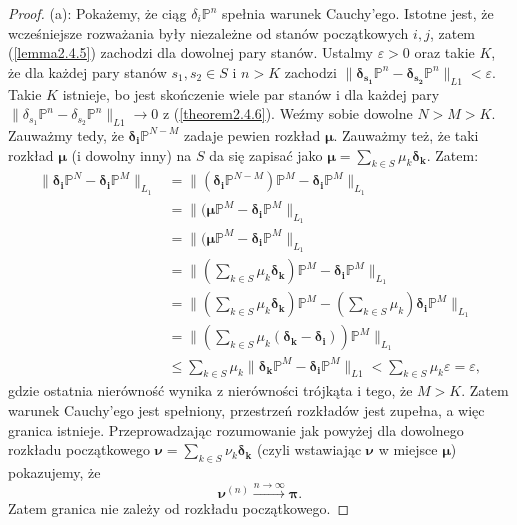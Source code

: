\documentclass[a4paper]{article}
\theoremstyle{defn}
\theoremstyle{theorem}
\theoremstyle{lemma}
\theoremstyle{cor}
\theoremstyle{fact}
\begin{document}
\begin{proof}
(a): Pokażemy, że ciąg $\delta_i\mathbb{P}^n$ spełnia warunek Cauchy'ego. Istotne jest, że wcześniejsze rozważania były niezależne od stanów początkowych $i, j$, zatem (\ref{lemma2.4.5}) zachodzi dla dowolnej pary stanów. Ustalmy $\varepsilon > 0$ oraz takie $K$, że dla każdej pary stanów $s_1, s_2 \in S$ i $n > K$  zachodzi $\|\boldsymbol{\delta_{s_1}}\mathbb{P}^n - \boldsymbol{\delta_{s_2}}\mathbb{P}^n\|_{L1} < \varepsilon$. Takie $K$ istnieje, bo jest skończenie wiele par stanów i dla każdej pary $\|\delta_{s_1}\mathbb{P}^n - \delta_{s_2}\mathbb{P}^n\|_{L1} \to 0$ z (\ref{theorem2.4.6}). Weźmy sobie dowolne $N > M > K$. Zauważmy tedy, że $\boldsymbol{\delta_i}\mathbb{P}^{N-M}$ zadaje pewien rozkład $\boldsymbol{\mu}$. Zauważmy też, że taki rozkład $\boldsymbol{\mu}$ (i dowolny inny) na $S$ da się zapisać jako $\boldsymbol{\mu} = \sum\limits_{k \in S} \mu_k\boldsymbol{\delta_k}$. Zatem:
\begin{align*}
\|\boldsymbol{\delta_i}\mathbb{P}^N - \boldsymbol{\delta_i}\mathbb{P}^M\|_{L_1} &= \|(\boldsymbol{\delta_i}\mathbb{P}^{N-M})\mathbb{P}^{M} - \boldsymbol{\delta_i}\mathbb{P}^M\|_{L_1}\\
&= \|(\boldsymbol{\mu}\mathbb{P}^{M} - \boldsymbol{\delta_i}\mathbb{P}^M\|_{L_1} \\
&= \|(\boldsymbol{\mu}\mathbb{P}^{M} - \boldsymbol{\delta_i}\mathbb{P}^M\|_{L_1} \\
&= \|(\sum\limits_{k \in S} \mu_k\boldsymbol{\delta_k})\mathbb{P}^{M} - \boldsymbol{\delta_i}\mathbb{P}^M\|_{L_1} \\
&= \|(\sum\limits_{k \in S} \mu_k\boldsymbol{\delta_k})\mathbb{P}^{M} - (\sum\limits_{k \in S} \mu_k)\boldsymbol{\delta_i}\mathbb{P}^M\|_{L_1} \\
&= \|(\sum\limits_{k \in S} \mu_k(\boldsymbol{\delta_k} - \boldsymbol{\delta_i}))\mathbb{P}^{M}\|_{L_1}  \\
&\leq  \sum\limits_{k \in S} \mu_k\|\boldsymbol{\delta_k}\mathbb{P}^M - \boldsymbol{\delta_i}\mathbb{P}^M\|_{L1} < \sum\limits_{k \in S} \mu_k\varepsilon = \varepsilon,
\end{align*}
gdzie ostatnia nierówność wynika z nierówności trójkąta i tego, że $M > K$. Zatem warunek Cauchy'ego jest spełniony, przestrzeń rozkładów jest zupełna, a więc granica istnieje. Przeprowadzając rozumowanie jak powyżej dla dowolnego rozkładu początkowego $\boldsymbol{\nu} = \sum\limits_{k \in S} \nu_k\boldsymbol{\delta_k}$ (czyli wstawiając $\boldsymbol{\nu}$ w miejsce $\boldsymbol{\mu}$) pokazujemy, że $$\boldsymbol{\nu}^{(n)} \xrightarrow{n \to \infty} \boldsymbol{\pi}.$$ Zatem granica nie zależy od rozkładu początkowego.
\end{proof}
\end{document}
